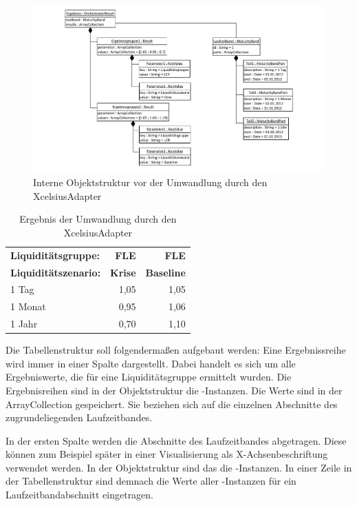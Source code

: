 \begin{onehalfspacing}
\begin{figure}[h]
\centering
\setlength{\unitlength}{1mm}
\includegraphics[width=15cm]{Visio/Entwurf-Objektstruktur.pdf}
\caption{Interne Objektstruktur vor der Umwandlung durch den XcelsiusAdapter \label{fig:objektstruktur}}
\end{figure} 


\begin{table}[htbp]
  \centering
  \caption{Ergebnis der Umwandlung durch den XcelsiusAdapter}
    \begin{tabular}{l|r|r}
    \toprule
    \textbf{Liquiditätsgruppe:} & \textbf{FLE} & \textbf{FLE} \\
    \textbf{Liquiditätszenario:} & \textbf{Krise} & \textbf{Baseline} \\
    \midrule
    1 Tag & 1,05  & 1,05 \\
    1 Monat & 0,95  & 1,06 \\
    1 Jahr & 0,70  & 1,10 \\
    \bottomrule
    \end{tabular}%
  \label{tab:zielstruktur}%
\end{table}%

Die Tabellenstruktur soll folgendermaßen aufgebaut werden: Eine Ergebnissreihe wird immer in einer Spalte dargestellt. Dabei handelt es sich um alle Ergebniswerte, die für eine Liquiditätsgruppe ermittelt wurden. Die Ergebnisreihen sind in der Objektstruktur die -Instanzen. Die Werte sind in der ArrayCollection  gespeichert. Sie beziehen sich auf die einzelnen Abschnitte des zugrundeliegenden Laufzeitbandes.

In der ersten Spalte werden die Abschnitte des Laufzeitbandes abgetragen. Diese können zum Beispiel später in einer Visualisierung als X-Achsenbeschriftung verwendet werden. In der Objektstruktur sind das die -Instanzen. In einer Zeile in der Tabellenstruktur sind demnach die Werte aller -Instanzen für ein Laufzeitbandabschnitt eingetragen.


\end{onehalfspacing}
